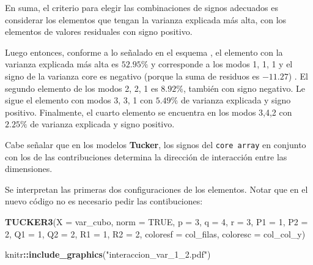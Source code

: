\documentclass[
  spanish,
]{article}
\newenvironment{Shaded}{\begin{snugshade}}{\end{snugshade}}
\newcommand{\DataTypeTok}[1]{\textcolor[rgb]{0.13,0.29,0.53}{#1}}
\newcommand{\DecValTok}[1]{\textcolor[rgb]{0.00,0.00,0.81}{#1}}
\newcommand{\KeywordTok}[1]{\textcolor[rgb]{0.13,0.29,0.53}{\textbf{#1}}}
\newcommand{\NormalTok}[1]{#1}
\newcommand{\OperatorTok}[1]{\textcolor[rgb]{0.81,0.36,0.00}{\textbf{#1}}}
\newcommand{\OtherTok}[1]{\textcolor[rgb]{0.56,0.35,0.01}{#1}}
\newcommand{\StringTok}[1]{\textcolor[rgb]{0.31,0.60,0.02}{#1}}
\begin{document}
En suma, el criterio para elegir las combinaciones de signos adecuados es considerar los elementos que tengan la varianza explicada más alta, con los elementos de valores residuales con signo positivo.

Luego entonces, conforme a lo señalado en el esquema , el elemento con la varianza explicada más alta es \(52.95\%\) y corresponde a los modos 1, 1, 1 y el signo de la varianza core es negativo (porque la suma de residuos es \(-11.27\)) . El segundo elemento de los modos 2, 2, 1 es \(8.92\%\), también con signo negativo. Le sigue el elemento con modos 3, 3, 1 con \(5.49\%\) de varianza explicada y signo positivo. Finalmente, el cuarto elemento se encuentra en los modos 3,4,2 con \(2.25\%\) de varianza explicada y signo positivo.

Cabe señalar que en los modelos \textbf{Tucker}, los signos del \texttt{core\ array} en conjunto con los de las contribuciones determina la dirección de interacción entre las dimensiones.

Se interpretan las primeras dos configuraciones de los elementos. Notar que en el nuevo código no es necesario pedir las contibuciones:

\begin{Shaded}
\begin{Highlighting}[]
\KeywordTok{TUCKER3}\NormalTok{(}\DataTypeTok{X =}\NormalTok{ var\_cubo,}
        \DataTypeTok{norm =} \OtherTok{TRUE}\NormalTok{,}
        \DataTypeTok{p =} \DecValTok{3}\NormalTok{,}
        \DataTypeTok{q =} \DecValTok{4}\NormalTok{,}
        \DataTypeTok{r =} \DecValTok{3}\NormalTok{,}
        \DataTypeTok{P1 =} \DecValTok{1}\NormalTok{,}
        \DataTypeTok{P2 =} \DecValTok{2}\NormalTok{,}
        \DataTypeTok{Q1 =} \DecValTok{1}\NormalTok{,}
        \DataTypeTok{Q2 =} \DecValTok{2}\NormalTok{,}
        \DataTypeTok{R1 =} \DecValTok{1}\NormalTok{,}
        \DataTypeTok{R2 =} \DecValTok{2}\NormalTok{,}
        \DataTypeTok{coloresf =}\NormalTok{ col\_filas,}
        \DataTypeTok{coloresc =}\NormalTok{ col\_col\_y)}
\end{Highlighting}
\end{Shaded}

\begin{Shaded}
\begin{Highlighting}[]
\NormalTok{knitr}\OperatorTok{::}\KeywordTok{include\_graphics}\NormalTok{(}\StringTok{"interaccion\_var\_1\_2.pdf"}\NormalTok{)}
\end{Highlighting}
\end{Shaded}
\end{document}
